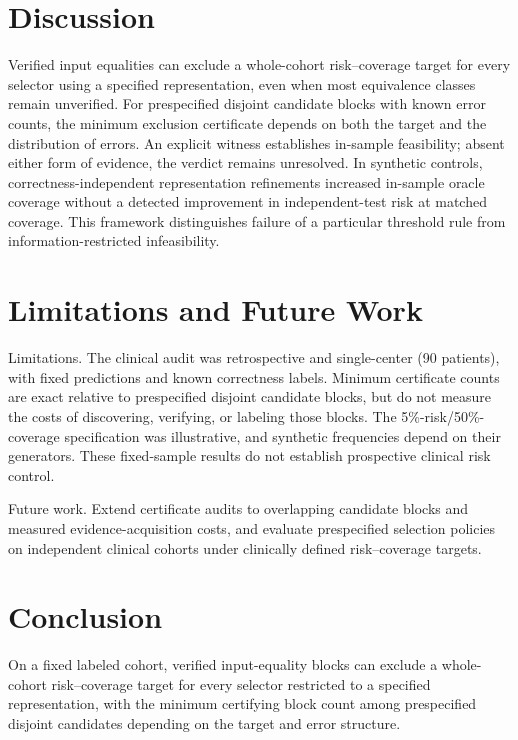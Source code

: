 \documentclass[letterpaper]{article}
\begin{document}
\section{Discussion}

Verified input equalities can exclude a whole-cohort risk--coverage target for every selector using a specified representation, even when most equivalence classes remain unverified. For prespecified disjoint candidate blocks with known error counts, the minimum exclusion certificate depends on both the target and the distribution of errors. An explicit witness establishes in-sample feasibility; absent either form of evidence, the verdict remains unresolved. In synthetic controls, correctness-independent representation refinements increased in-sample oracle coverage without a detected improvement in independent-test risk at matched coverage. This framework distinguishes failure of a particular threshold rule from information-restricted infeasibility.

\section{Limitations and Future Work}

Limitations. The clinical audit was retrospective and single-center (90 patients), with fixed predictions and known correctness labels. Minimum certificate counts are exact relative to prespecified disjoint candidate blocks, but do not measure the costs of discovering, verifying, or labeling those blocks. The 5\%-risk/50\%-coverage specification was illustrative, and synthetic frequencies depend on their generators. These fixed-sample results do not establish prospective clinical risk control.

Future work. Extend certificate audits to overlapping candidate blocks and measured evidence-acquisition costs, and evaluate prespecified selection policies on independent clinical cohorts under clinically defined risk--coverage targets.

\section{Conclusion}

On a fixed labeled cohort, verified input-equality blocks can exclude a whole-cohort risk--coverage target for every selector restricted to a specified representation, with the minimum certifying block count among prespecified disjoint candidates depending on the target and error structure.
\end{document}
